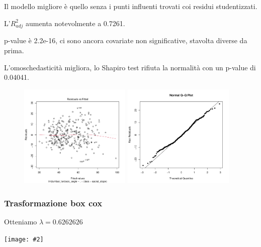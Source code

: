 \documentclass{beamer}
\newcommand{\fg}[2]{%
  \begin{center}
      \texttt{[image: \#2]}%
  \end{center}
}
\begin{document}
\begin{frame}
	Il modello migliore è quello senza i punti influenti trovati coi residui studentizzati.

	L'$R^2_{adj}$ aumenta notevolmente a 0.7261.

	p-value è 2.2e-16, ci sono ancora covariate non significative, stavolta diverse da prima.
\end{frame}



\begin{frame}
	L'omoschedasticità migliora, lo Shapiro test rifiuta la normalità con un p-value di 0.04041.
	\begin{figure}
	   \includegraphics[width=0.475\textwidth]{07omoschedasticita}
	   \hfill
	   \includegraphics[width=0.475\textwidth]{08qqplot}
	\end{figure}
\end{frame}


\begin{frame}
	\frametitle{Trasformazione box cox}
	Otteniamo $\lambda = 0.6262626$
	\fg{0.6}{09boxcox}
\end{frame}
\end{document}
